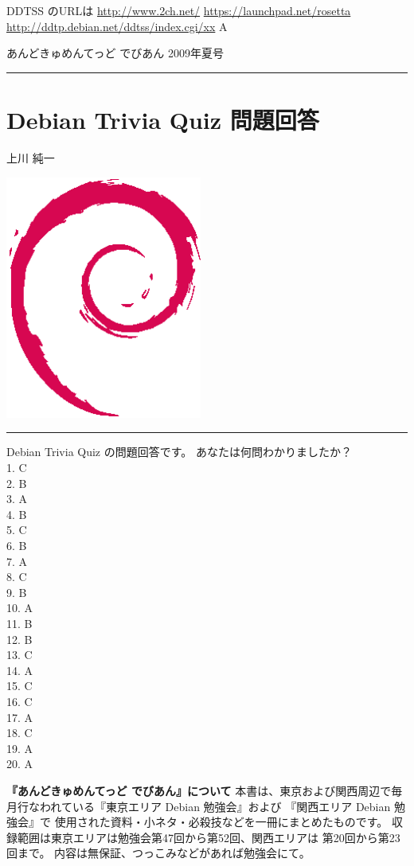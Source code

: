 \documentclass[mingoth,a4paper]{jsarticle}
\renewcommand{\dancersection}[2]{%
\newpage
あんどきゅめんてっど でびあん 2009年夏号
%
\vspace{0.1mm}\\
{\color{dancerlightblue}\rule{\hsize}{2mm}}

%
%
\begin{minipage}[t]{0.6\hsize}
\color{dancerdarkblue}
\vspace{1cm}
\section{#1}
\hfill{}#2\\
\end{minipage}
\begin{minipage}[t]{0.4\hsize}
\vspace{-2cm}
\hfill{}\includegraphics[height=8cm]{image200502/openlogo-nd.eps}\\
\vspace{-5cm}
\end{minipage}
%
%
{\color{dancerdarkblue}\rule{0.74\hsize}{2mm}}
%
\vspace{2cm}
}
\begin{document}
\begin{commandline}
\santaku
{DDTSS のURLは}
{\url{http://www.2ch.net/}}
{\url{https://launchpad.net/rosetta}}
{\url{http://ddtp.debian.net/ddtss/index.cgi/xx}}
{A}


\dancersection{Debian Trivia Quiz 問題回答}{上川 純一}

\begin{multicols}{2}
 Debian Trivia Quiz の問題回答です。
 あなたは何問わかりましたか？
 \\
1. C\\
2. B\\
3. A\\
4. B\\
5. C\\
6. B\\
7. A\\
8. C\\
9. B\\
10. A\\
11. B\\
12. B\\
13. C\\
14. A\\
15. C\\
16. C\\
17. A\\
18. C\\
19. A\\
20. A\\


\end{multicols}


\printindex

\cleartooddpage

\thispagestyle{empty} 
{
\large
\begin{itembox}{\bf 『あんどきゅめんてっど でびあん』について}
本書は、東京および関西周辺で毎月行なわれている『東京エリア Debian 勉強会』および
『関西エリア Debian 勉強会』で
使用された資料・小ネタ・必殺技などを一冊にまとめたものです。
収録範囲は東京エリアは勉強会第47回から第52回、関西エリアは
第20回から第23回まで。
内容は無保証、つっこみなどがあれば勉強会にて。
\end{itembox}
}


\end{commandline}
\end{document}
